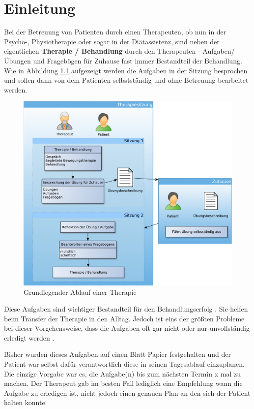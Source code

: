 \chapter{Einleitung}
Bei der Betreuung von Patienten durch einen Therapeuten, ob nun in der Psycho-, Physiotherapie oder sogar in der Diätassistenz, sind neben der eigentlichen \textbf{Therapie / Behandlung} durch den Therapeuten - Aufgaben/Übungen und Fragebögen für Zuhause fast immer Bestandteil der Behandlung. Wie in Abbildung \ref{TherapieAblauf} aufgezeigt werden die Aufgaben in der Sitzung besprochen und sollen dann von dem Patienten selbstständig und ohne Betreuung bearbeitet werden.

\begin{figure}[H]
	\centering
	\includegraphics[scale=0.55]{images/TherapieAblauf}
	\caption[Grundlegender Ablauf einer Therapie]{Grundlegender Ablauf einer Therapie}
	\label{TherapieAblauf}
\end{figure}

Diese Aufgaben sind wichtiger Bestandteil für den Behandlungserfolg \cite{SL05}. Sie helfen beim Transfer der Therapie in den Alltag. Jedoch ist eins der größten Probleme bei dieser Vorgehensweise, dass die Aufgaben oft gar nicht oder nur unvollständig erledigt werden \cite{FF01}.

Bisher wurden dieses Aufgaben auf einen Blatt Papier festgehalten und der Patient war selbst dafür verantwortlich diese in seinen Tagesablauf einzuplanen. Die einzige Vorgabe war es, die Aufgabe(n) bis zum nächsten Termin x mal zu machen. Der Therapeut gab im besten Fall lediglich eine Empfehlung wann die Aufgabe zu erledigen ist, nicht jedoch einen genauen Plan an den sich der Patient halten konnte.
